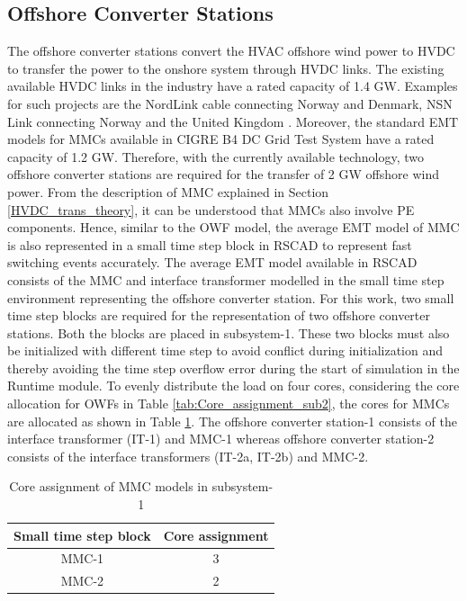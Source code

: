 \subsection{Offshore Converter Stations}\label{offshore_conv_stations}
The offshore converter stations convert the \gls{HVAC} offshore wind power to \gls{HVDC} to transfer the power to the onshore system through \gls{HVDC} links.  %
The existing available \gls{HVDC} links in the industry have a rated capacity of 1.4 GW. Examples for such projects are the NordLink cable connecting Norway and Denmark, NSN Link connecting Norway and the United Kingdom \cite{ryndzionek_evolution_2020}. Moreover, the standard \gls{EMT} models for \gls{MMC}s available in CIGRE B4 DC Grid Test System \cite{vrana2013cigre} have a rated capacity of 1.2 GW. Therefore, with the currently available technology, two offshore converter stations are required for the transfer of 2 GW offshore wind power. From the description of \gls{MMC} explained in Section \ref{HVDC_trans_theory}, it can be understood that \gls{MMC}s also involve \gls{PE} components. Hence, similar to the \gls{OWF} model, the average \gls{EMT} model of \gls{MMC} is also represented in a small time step block in RSCAD to represent fast switching events accurately. The average \gls{EMT} model available in RSCAD consists of the \gls{MMC} and interface transformer modelled in the small time step environment representing the offshore converter station. For this work, two small time step blocks are required for the representation of two offshore converter stations. Both the blocks are placed in subsystem-1. These two blocks must also be initialized with different time step to avoid conflict during initialization and thereby avoiding the time step overflow error during the start of simulation in the Runtime module. To evenly distribute the load on four cores, considering the core allocation for \gls{OWF}s in Table \ref{tab:Core_assignment_sub2}, the cores for \gls{MMC}s are allocated as shown in Table \ref{tab:Core_assignment_sub1}. The offshore converter station-1 consists of the interface transformer (IT-1) and \gls{MMC}-1 whereas offshore converter station-2 consists of the interface transformers (IT-2a, IT-2b) and \gls{MMC}-2. 

\begin{table}[H]
\centering
\begin{tabular}{|c|c|}
\hline
\textbf{Small time step block} & \textbf{Core assignment} \\ \hline
MMC-1                          & 3                        \\ \hline
MMC-2                          & 2                        \\ \hline

\end{tabular}
\caption{Core assignment of MMC models in subsystem-1}
\label{tab:Core_assignment_sub1}
\end{table}


